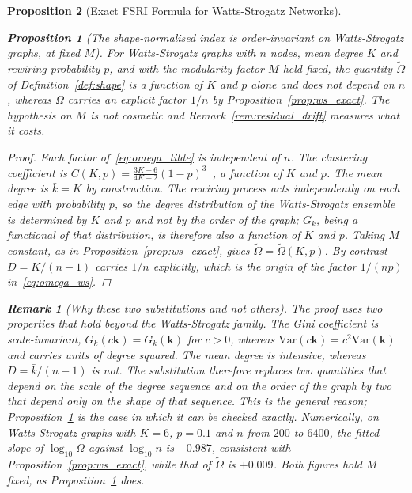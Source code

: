 \documentclass[11pt,a4paper]{article}
\newtheorem{proposition}{Proposition}
\newtheorem{remark}{Remark}
\begin{document}
\begin{proposition}[Exact FSRI Formula for Watts-Strogatz Networks]
\begin{proposition}[The shape-normalised index is order-invariant on
Watts-Strogatz graphs, at fixed $M$]
\label{prop:shape_invariant}
For Watts-Strogatz graphs with $n$ nodes, mean degree $K$ and rewiring
probability $p$, and with the modularity factor $M$ held fixed, the quantity
$\widetilde{\Omega}$ of Definition~\ref{def:shape} is a function of $K$ and
$p$ alone and does not depend on $n$, whereas $\Omega$ carries an explicit
factor $1/n$ by Proposition~\ref{prop:ws_exact}. The hypothesis on $M$ is not
cosmetic and Remark~\ref{rem:residual_drift} measures what it costs.
\end{proposition}

\begin{proof}
Each factor of~\eqref{eq:omega_tilde} is independent of $n$. The clustering
coefficient is $C(K,p) = \frac{3K-6}{4K-2}(1-p)^3$~\cite{barrat2000},
a function of $K$ and $p$. The mean degree is $\bar{k} = K$ by construction.
The rewiring process acts independently on each edge with probability $p$,
so the degree distribution of the Watts-Strogatz ensemble is determined by
$K$ and $p$ and not by the order of the graph; $G_k$, being a functional of
that distribution, is therefore also a function of $K$ and $p$. Taking $M$
constant, as in Proposition~\ref{prop:ws_exact}, gives
$\widetilde{\Omega} = \widetilde{\Omega}(K,p)$. By contrast
$D = K/(n-1)$ carries $1/n$ explicitly, which is the origin of the factor
$1/(np)$ in~\eqref{eq:omega_ws}.
\end{proof}

\begin{remark}[Why these two substitutions and not others]
The proof uses two properties that hold beyond the Watts-Strogatz family.
The Gini coefficient is scale-invariant, $G_k(c\mathbf{k}) = G_k(\mathbf{k})$
for $c>0$, whereas $\mathrm{Var}(c\mathbf{k}) = c^2\mathrm{Var}(\mathbf{k})$
and carries units of degree squared. The mean degree is intensive, whereas
$D = \bar{k}/(n-1)$ is not. The substitution therefore replaces two
quantities that depend on the scale of the degree sequence and on the order
of the graph by two that depend only on the shape of that sequence. This is
the general reason; Proposition~\ref{prop:shape_invariant} is the case in
which it can be checked exactly. Numerically, on Watts-Strogatz graphs with
$K=6$, $p=0.1$ and $n$ from $200$ to $6400$, the fitted slope of
$\log_{10}\Omega$ against $\log_{10} n$ is $-0.987$, consistent with
Proposition~\ref{prop:ws_exact}, while that of $\widetilde{\Omega}$ is
$+0.009$. Both figures hold $M$ fixed, as
Proposition~\ref{prop:shape_invariant} does.
\end{remark}


\end{proposition}
\end{document}
